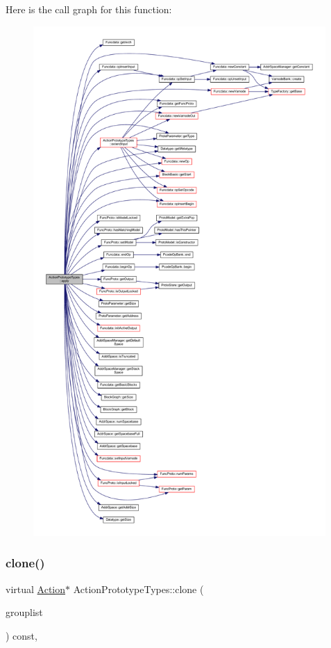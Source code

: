 Here is the call graph for this function\+:
\nopagebreak
\begin{figure}[H]
\begin{center}
\leavevmode
\includegraphics[height=550pt]{class_action_prototype_types_a4c4654505369c0d674f2260c313c76b3_cgraph}
\end{center}
\end{figure}
\mbox{\label{class_action_prototype_types_aab34b0de3c657db76bef16ab5e2ac0dc}} 
\subsubsection{\texorpdfstring{clone()}{clone()}}
{\footnotesize\ttfamily virtual \mbox{\hyperlink{class_action}{Action}}$\ast$ Action\+Prototype\+Types\+::clone (\begin{DoxyParamCaption}\item[{const \mbox{\hyperlink{class_action_group_list}{Action\+Group\+List}} \&}]{grouplist }\end{DoxyParamCaption}) const\hspace{0.3cm}{\ttfamily [inline]}, {\ttfamily [virtual]}}



